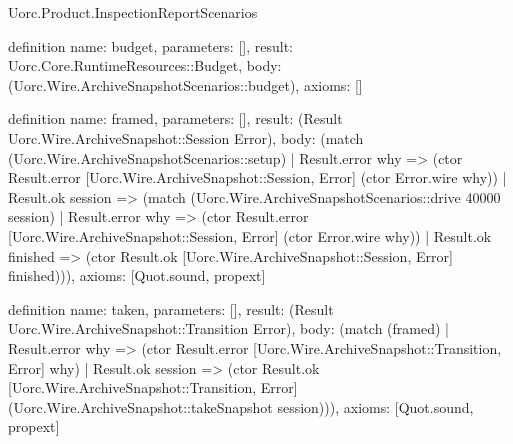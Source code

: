 \begin{lexlean}{Uorc.Product.InspectionReportScenarios}
\begin{semanticmodule}
definition{
  name: budget,
  parameters: [],
  result: Uorc.Core.RuntimeResources::Budget,
  body: (Uorc.Wire.ArchiveSnapshotScenarios::budget),
  axioms: []
}

definition{
  name: framed,
  parameters: [],
  result: (Result Uorc.Wire.ArchiveSnapshot::Session Error),
  body: (match (Uorc.Wire.ArchiveSnapshotScenarios::setup)
    | Result.error why => (ctor Result.error [Uorc.Wire.ArchiveSnapshot::Session, Error] (ctor Error.wire why))
    | Result.ok session => (match (Uorc.Wire.ArchiveSnapshotScenarios::drive 40000 session)
      | Result.error why => (ctor Result.error [Uorc.Wire.ArchiveSnapshot::Session, Error] (ctor Error.wire why))
      | Result.ok finished => (ctor Result.ok [Uorc.Wire.ArchiveSnapshot::Session, Error] finished))),
  axioms: [Quot.sound, propext]
}

definition{
  name: taken,
  parameters: [],
  result: (Result Uorc.Wire.ArchiveSnapshot::Transition Error),
  body: (match (framed)
    | Result.error why => (ctor Result.error [Uorc.Wire.ArchiveSnapshot::Transition, Error] why)
    | Result.ok session => (ctor Result.ok [Uorc.Wire.ArchiveSnapshot::Transition, Error] (Uorc.Wire.ArchiveSnapshot::takeSnapshot session))),
  axioms: [Quot.sound, propext]
}


\end{semanticmodule}
\end{lexlean}
